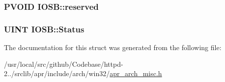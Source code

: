 \subsubsection[{\texorpdfstring{reserved}{reserved}}]{\setlength{\rightskip}{0pt plus 5cm}P\+V\+O\+ID I\+O\+S\+B\+::reserved}\hypertarget{structIOSB_a50a5f9c7d027d0d1e977a73bad18a9b8}{}\label{structIOSB_a50a5f9c7d027d0d1e977a73bad18a9b8}
\subsubsection[{\texorpdfstring{Status}{Status}}]{\setlength{\rightskip}{0pt plus 5cm}U\+I\+NT I\+O\+S\+B\+::\+Status}\hypertarget{structIOSB_a2b17ec69f3b2eeec3baa6e195c117e2b}{}\label{structIOSB_a2b17ec69f3b2eeec3baa6e195c117e2b}


The documentation for this struct was generated from the following file\+:\begin{DoxyCompactItemize}
\item 
/usr/local/src/github/\+Codebase/httpd-\/2../srclib/apr/include/arch/win32/\hyperlink{win32_2apr__arch__misc_8h}{apr\+\_\+arch\+\_\+misc.\+h}\end{DoxyCompactItemize}
